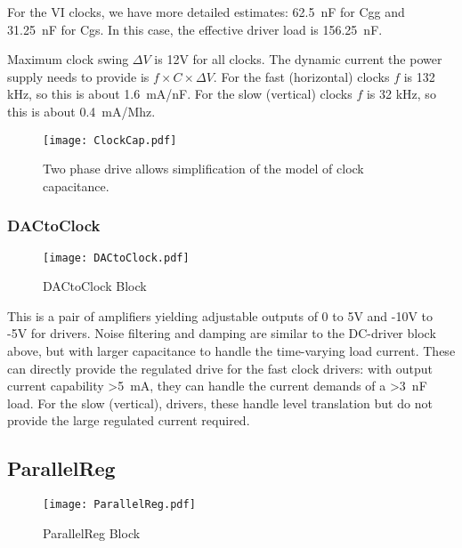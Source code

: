 \documentclass[a4paper,12pt]{article}
\begin{document}
For the VI clocks, we have more detailed estimates: 62.5\ nF for Cgg and 31.25\ nF for Cgs. In this case, the effective driver load is 156.25\ nF.

Maximum clock swing $\Delta V$ is 12V for all clocks. The dynamic current the power supply needs to provide is $f\times C \times \Delta V$. For the fast (horizontal) clocks $f$ is 132 kHz, so this is about 1.6\ mA/nF. For the slow (vertical) clocks $f$ is 32 kHz, so this is about 0.4\ mA/Mhz.

   \begin{figure}[h]
   \begin{center}
   \texttt{[image: ClockCap.pdf]}
   \caption{Two phase drive allows simplification of the model of clock capacitance.}
   \label{ClockCap}
   \end{center}
   \end{figure}

\subsubsection{DACtoClock}

   \begin{figure}
   \begin{center}
   \texttt{[image: DACtoClock.pdf]}
   \end{center}
   \caption{DACtoClock Block}
   \end{figure}


This is a pair of amplifiers yielding adjustable outputs of 0 to 5V and -10V to -5V for drivers. Noise filtering and damping are similar to the DC-driver block above, but with larger capacitance to handle the time-varying load current. These can directly provide the regulated drive for the fast clock drivers: with output current capability >5\ mA, they can handle the current demands of a >3\ nF load. For the slow (vertical), drivers, these handle level translation but do not provide the large regulated current required.

\subsection{ParallelReg}
   \begin{figure}
   \begin{center}
   \texttt{[image: ParallelReg.pdf]}
   \end{center}
   \caption{ParallelReg Block}
   \end{figure}
\end{document}
